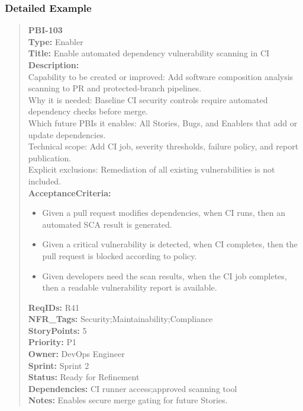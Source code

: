 \documentclass[11pt,a4paper]{article}
\begin{document}
\subsubsection*{Detailed Example}
\begin{quote}
\textbf{PBI-103} \\
\textbf{Type:} Enabler \\
\textbf{Title:} Enable automated dependency vulnerability scanning in CI \\

\textbf{Description:} \\
Capability to be created or improved: Add software composition analysis scanning to PR and protected-branch pipelines. \\
Why it is needed: Baseline CI security controls require automated dependency checks before merge. \\
Which future PBIs it enables: All Stories, Bugs, and Enablers that add or update dependencies. \\
Technical scope: Add CI job, severity thresholds, failure policy, and report publication. \\
Explicit exclusions: Remediation of all existing vulnerabilities is not included. \\

\textbf{AcceptanceCriteria:}
\begin{itemize}[leftmargin=1.5em]
    \item Given a pull request modifies dependencies, when CI runs, then an automated SCA result is generated.
    \item Given a critical vulnerability is detected, when CI completes, then the pull request is blocked according to policy.
    \item Given developers need the scan results, when the CI job completes, then a readable vulnerability report is available.
\end{itemize}

\textbf{ReqIDs:} R41 \\
\textbf{NFR\_Tags:} Security;Maintainability;Compliance \\
\textbf{StoryPoints:} 5 \\
\textbf{Priority:} P1 \\
\textbf{Owner:} DevOps Engineer \\
\textbf{Sprint:} Sprint 2 \\
\textbf{Status:} Ready for Refinement \\
\textbf{Dependencies:} CI runner access;approved scanning tool \\
\textbf{Notes:} Enables secure merge gating for future Stories.
\end{quote}
\end{document}

